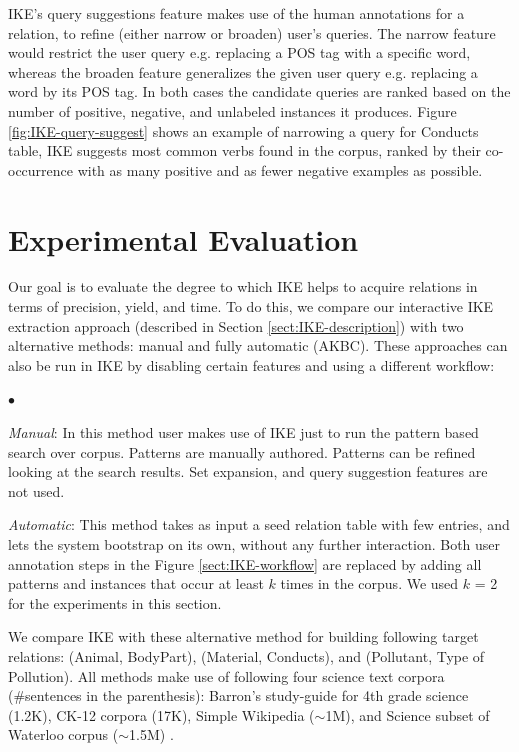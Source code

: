\documentclass[11pt,letterpaper]{article}
\newcommand{\squishlist}{
   \begin{list}{$\bullet$}
    { \setlength{\itemsep}{-1pt}      \setlength{\parsep}{3pt}
      \setlength{\topsep}{1pt}       \setlength{\partopsep}{0pt}
      \setlength{\leftmargin}{1.5em} \setlength{\labelwidth}{1em}
      \setlength{\labelsep}{0.5em} } }
\newcommand{\squishend}{
    \end{list}  }
\begin{document}
IKE's query suggestions feature makes use of  the human annotations for a relation, to refine (either narrow or broaden) user's queries. The narrow feature would restrict the user query e.g. replacing a POS tag with a specific word, whereas the broaden feature generalizes the given user query e.g. replacing a word by its POS tag. In both cases the candidate queries are ranked based on the number of positive, negative, and unlabeled instances it produces.
Figure \ref{fig:IKE-query-suggest} shows an example of narrowing a query for Conducts table, IKE suggests most common verbs found in the corpus, ranked by their co-occurrence with as many positive and as fewer negative examples as possible. 



\section{Experimental Evaluation} \label{sect:expt-eval}
Our goal is to evaluate the degree to which IKE helps to acquire relations in terms of precision, yield, and time. To do this, we compare our interactive IKE extraction approach (described in Section \ref{sect:IKE-description}) with two alternative methods: manual and fully automatic (AKBC). These approaches can also be run in IKE by disabling certain features and using a different workflow:

\squishlist
\item \emph{Manual}: In this method user makes use of IKE just to run the pattern based search over corpus. Patterns are manually authored. Patterns can be refined looking at the search results. Set expansion, and query suggestion features are not used. 
\item \emph{Automatic}: This method takes as input a seed relation table with few entries, and lets the system bootstrap on its own, without any further interaction. Both user annotation steps in the Figure \ref{sect:IKE-workflow} are replaced by adding all patterns and instances that occur at least $k$ times in the corpus. We used $k$ = 2 for the experiments in this section.
\squishend

We compare IKE with these alternative method for building following target relations: (Animal, BodyPart),  (Material, Conducts), and (Pollutant, Type of Pollution). All methods make use of following four science text corpora (\#sentences in the parenthesis): Barron's study-guide for 4th grade science (1.2K), CK-12 corpora (17K), Simple Wikipedia ($\sim$1M), and Science subset of Waterloo corpus ($\sim$1.5M) \cite{waterloo-corpus}.
\end{document}
